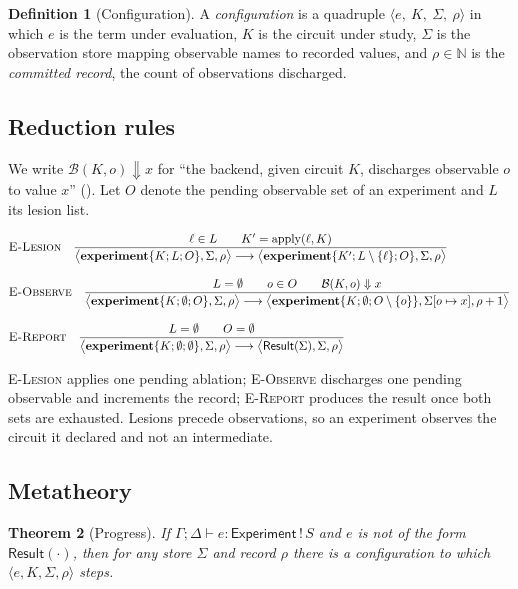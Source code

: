 \documentclass[11pt,twocolumn,a4paper]{article}
\theoremstyle{thmstyle}
\newtheorem{theorem}{Theorem}[section]
\theoremstyle{definition}
\newtheorem{definition}[theorem]{Definition}
\theoremstyle{remark}
\newcommand{\N}{\mathbb{N}}
\newcommand{\Env}{\Gamma}
\newcommand{\store}{\Sigma}
\newcommand{\steps}{\longrightarrow}
\newcommand{\Exp}{\textsf{Experiment}}
\newcommand{\Res}{\textsf{Result}}
\newcommand{\experiment}{\mathbf{experiment}}
\begin{document}
\begin{definition}[Configuration]
\label{def:config}
A \emph{configuration} is a quadruple
$\langle e,\ K,\ \store,\ \rho\rangle$ in which $e$ is the term under
evaluation, $K$ is the circuit under study, $\store$ is the observation store
mapping observable names to recorded values, and $\rho\in\N$ is the
\emph{committed record}, the count of observations discharged.
\end{definition}

\subsection{Reduction rules}

We write $\mathcal{B}(K,o)\Downarrow x$ for ``the backend, given circuit $K$,
discharges observable $o$ to value $x$'' (). Let $O$ denote
the pending observable set of an experiment and $L$ its lesion list.

\begin{align*}
&\textsc{E-Lesion}\quad
\frac{\ell\in L\qquad K'=\mathrm{apply}(\ell,K)}
{\bigl\langle \experiment\{K;L;O\},\store,\rho\bigr\rangle
\steps
\bigl\langle \experiment\{K';L\setminus\{\ell\};O\},\store,\rho\bigr\rangle}
\\[8pt]
&\textsc{E-Observe}\quad
\frac{L=\emptyset\qquad o\in O\qquad \mathcal{B}(K,o)\Downarrow x}
{\bigl\langle \experiment\{K;\emptyset;O\},\store,\rho\bigr\rangle
\steps
\bigl\langle \experiment\{K;\emptyset;O\setminus\{o\}\},
 \store[o\mapsto x],\rho+1\bigr\rangle}
\\[8pt]
&\textsc{E-Report}\quad
\frac{L=\emptyset\qquad O=\emptyset}
{\bigl\langle \experiment\{K;\emptyset;\emptyset\},\store,\rho\bigr\rangle
\steps
\bigl\langle \Res(\store),\store,\rho\bigr\rangle}
\end{align*}

\textsc{E-Lesion} applies one pending ablation; \textsc{E-Observe} discharges
one pending observable and increments the record; \textsc{E-Report} produces
the result once both sets are exhausted. Lesions precede observations, so an
experiment observes the circuit it declared and not an intermediate.

\subsection{Metatheory}

\begin{theorem}[Progress]
\label{thm:progress}
If $\Env;\Delta\vdash e:\Exp\,!\,S$ and $e$ is not of the form $\Res(\cdot)$,
then for any store $\store$ and record $\rho$ there is a configuration to
which $\langle e,K,\store,\rho\rangle$ steps.
\end{theorem}
\end{document}
